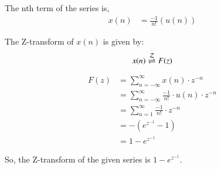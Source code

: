 \documentclass[journal,12pt,twocolumn]{IEEEtran}
\begin{document}
The nth term of the series is, 
\begin{align*}
    x(n) & = \frac{-1}{n!} (u(n))
\end{align*} 

The Z-transform of $ x(n) $ is given by:
$$x(n) \overset{\mathcal{Z}}{ \rightleftharpoons} F(z)$$

\begin{align*}
    F(z) & = \sum_{n=-\infty}^{\infty} x(n) \cdot z^{-n} \\
    & = \sum_{n=-\infty}^{\infty} \frac{-1}{n!}\cdot u(n) \cdot z^{-n} \\
    & = \sum_{n=1}^{\infty} \frac{-1}{n!} \cdot z^{-n} \\
    & = - (e^{z^{-1}} - 1) \\
    & = 1 - e^{z^{-1}}  
\end{align*}

So, the Z-transform of the given series is 
$ 1 - e^{z^{-1}} $.
\end{document}
